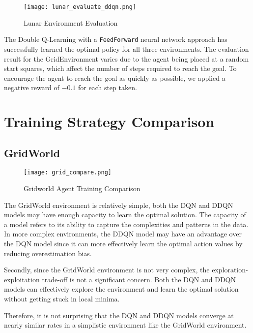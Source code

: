\documentclass{article} %
\begin{document}
\begin{figure}[H]
    \begin{center}
        \texttt{[image: lunar\_evaluate\_ddqn.png]}
    \end{center}
    \caption{Lunar Environment Evaluation}
\end{figure}

The Double Q-Learning with a \verb|FeedForward| neural network approach has successfully learned the optimal
policy for all three environments. The evaluation result for the GridEnvironment varies
due to the agent being placed at a random start squares, which affect the number of steps
required to reach the goal. To encourage the agent to reach the goal as quickly as possible,
we applied a negative reward of $-0.1$ for each step taken.

\section{Training Strategy Comparison}

\subsection{GridWorld}

\begin{figure}[H]
    \begin{center}
        \texttt{[image: grid\_compare.png]}
    \end{center}
    \caption{Gridworld Agent Training Comparison}
\end{figure}

The GridWorld environment is relatively simple, both the DQN and DDQN models may have enough capacity to learn the optimal solution. The capacity of a model refers to its ability to capture the complexities and patterns in the data. In more complex environments, the DDQN model may have an advantage over the DQN model since it can more effectively learn the optimal action values by reducing overestimation bias.

Secondly, since the GridWorld environment is not very complex, the exploration-exploitation trade-off is not a significant concern. Both the DQN and DDQN models can effectively explore the environment and learn the optimal solution without getting stuck in local minima.

Therefore, it is not surprising that the DQN and DDQN models converge at nearly similar rates in a simplistic environment like the GridWorld environment.
\end{document}
